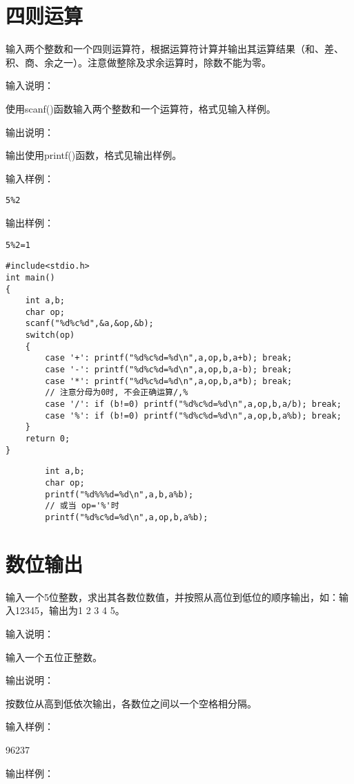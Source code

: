 \section{四则运算}
输入两个整数和一个四则运算符，根据运算符计算并输出其运算结果（和、差、积、商、余之一）。注意做整除及求余运算时，除数不能为零。

输入说明：

使用scanf()函数输入两个整数和一个运算符，格式见输入样例。

输出说明：

输出使用printf()函数，格式见输出样例。

输入样例：

\lstinline|5%2|

输出样例：

\lstinline|5%2=1|

\begin{lstlisting}
#include<stdio.h>    
int main()                   
{  
	int a,b;
	char op;
	scanf("%d%c%d",&a,&op,&b);
	switch(op)
	{
		case '+': printf("%d%c%d=%d\n",a,op,b,a+b); break;
		case '-': printf("%d%c%d=%d\n",a,op,b,a-b); break;
		case '*': printf("%d%c%d=%d\n",a,op,b,a*b); break;
		// 注意分母为0时, 不会正确运算/,%
		case '/': if (b!=0) printf("%d%c%d=%d\n",a,op,b,a/b); break;
		case '%': if (b!=0) printf("%d%c%d=%d\n",a,op,b,a%b); break;
	}
	return 0;           
}                 
\end{lstlisting}

\begin{note}
	\begin{lstlisting}
		int a,b;
		char op;
		printf("%d%%%d=%d\n",a,b,a%b);
		// 或当 op='%'时
		printf("%d%c%d=%d\n",a,op,b,a%b);
	\end{lstlisting}
\end{note}
	

\section{数位输出}
输入一个5位整数，求出其各数位数值，并按照从高位到低位的顺序输出，如：输入12345，输出为1 2 3 4 5。

输入说明：

输入一个五位正整数。

输出说明：

按数位从高到低依次输出，各数位之间以一个空格相分隔。

输入样例：

96237

输出样例：

